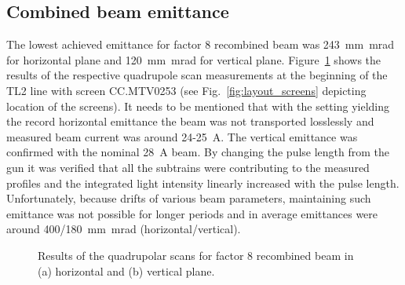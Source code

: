\subsection{Combined beam emittance}



The lowest achieved emittance for factor 8 recombined beam  was 243~mm~mrad for horizontal plane
and 120~mm~mrad for vertical plane.
Figure~\ref{fig:record_low_factor8_girder27} shows the results of the respective quadrupole scan measurements 
at the beginning of the TL2 line with screen CC.MTV0253
(see Fig.~\ref{fig:layout_screens} depicting location of the screens).
It needs to be mentioned that with the setting yielding the record horizontal emittance 
the beam was not transported losslessly and measured beam current was around 24-25~A.
The vertical emittance was confirmed with the nominal 28~A beam.
By changing the pulse length from the gun it was verified that all the subtrains were contributing 
to the measured profiles and the integrated light intensity linearly increased with the pulse length.
Unfortunately, because drifts of various beam parameters, maintaining such emittance was not possible 
for longer periods and in average emittances were around 400/180~mm~mrad (horizontal/vertical).


\begin{figure}[!h]
 \begin{center}
 \end{center}
 \caption{Results of the quadrupolar scans for factor 8 recombined beam in (a) horizontal and (b) vertical plane.}
 \label{fig:record_low_factor8_girder27}
\end{figure}




